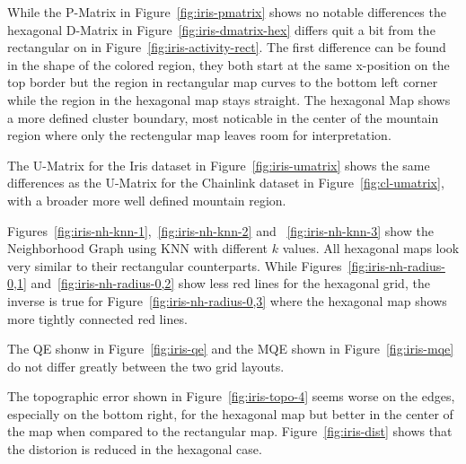 \documentclass{acm_proc_article-sp}
\begin{document}
While the P-Matrix in Figure~\ref{fig:iris-pmatrix} shows no notable differences the hexagonal D-Matrix in Figure~\ref{fig:iris-dmatrix-hex} differs quit a bit from the rectangular on in Figure~\ref{fig:iris-activity-rect}. The first difference can be found in the shape of the colored region, they both start at the same x-position on the top border but the region in rectangular map curves to the bottom left corner while the region in the hexagonal map stays straight.
The hexagonal Map shows a more defined cluster boundary, most noticable in the center of the mountain region where only the rectengular map leaves room for interpretation.

The U-Matrix for the Iris dataset in Figure~\ref{fig:iris-umatrix} shows the same differences as the U-Matrix for the Chainlink dataset in Figure~\ref{fig:cl-umatrix}, with a broader more well defined mountain region.


Figures~\ref{fig:iris-nh-knn-1},~\ref{fig:iris-nh-knn-2} and ~\ref{fig:iris-nh-knn-3} show the Neighborhood Graph using KNN with different $k$ values. All hexagonal maps look very similar to their rectangular counterparts.
While Figures~\ref{fig:iris-nh-radius-0,1} and~\ref{fig:iris-nh-radius-0,2} show less red lines for the hexagonal grid, the inverse is true for Figure~\ref{fig:iris-nh-radius-0,3} where the hexagonal map shows more tightly connected red lines.


The QE shonw in Figure~\ref{fig:iris-qe} and the MQE shown in Figure~\ref{fig:iris-mqe} do not differ greatly between the two grid layouts.



The topographic error shown in Figure~\ref{fig:iris-topo-4} seems worse on the edges, especially on the bottom right, for the hexagonal map but better in the center of the map when compared to the rectangular map.
Figure~\ref{fig:iris-dist} shows that the distorion is reduced in the hexagonal case.
\end{document}
